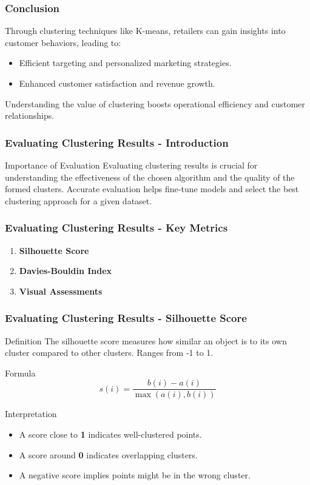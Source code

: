 \documentclass[aspectratio=169]{beamer}
\begin{document}
\begin{frame}[fragile]
    \frametitle{Conclusion}
    Through clustering techniques like K-means, retailers can gain insights into customer behaviors, leading to:
    \begin{itemize}
        \item Efficient targeting and personalized marketing strategies.
        \item Enhanced customer satisfaction and revenue growth.
    \end{itemize}
    Understanding the value of clustering boosts operational efficiency and customer relationships.
\end{frame}

\begin{frame}[fragile]
    \frametitle{Evaluating Clustering Results - Introduction}
    \begin{block}{Importance of Evaluation}
        Evaluating clustering results is crucial for understanding the effectiveness of the chosen algorithm and the quality of the formed clusters. 
        Accurate evaluation helps fine-tune models and select the best clustering approach for a given dataset.
    \end{block}
\end{frame}

\begin{frame}[fragile]
    \frametitle{Evaluating Clustering Results - Key Metrics}
    \begin{enumerate}
        \item \textbf{Silhouette Score}
        \item \textbf{Davies-Bouldin Index}
        \item \textbf{Visual Assessments}
    \end{enumerate}
\end{frame}

\begin{frame}[fragile]
    \frametitle{Evaluating Clustering Results - Silhouette Score}
    \begin{block}{Definition}
        The silhouette score measures how similar an object is to its own cluster compared to other clusters. Ranges from -1 to 1.
    \end{block}
    \begin{block}{Formula}
        \begin{equation}
        s(i) = \frac{b(i) - a(i)}{\max(a(i), b(i))}
        \end{equation}
    \end{block}
    \begin{block}{Interpretation}
        \begin{itemize}
            \item A score close to \textbf{1} indicates well-clustered points.
            \item A score around \textbf{0} indicates overlapping clusters.
            \item A negative score implies points might be in the wrong cluster.
        \end{itemize}
    \end{block}
\end{frame}
\end{document}
